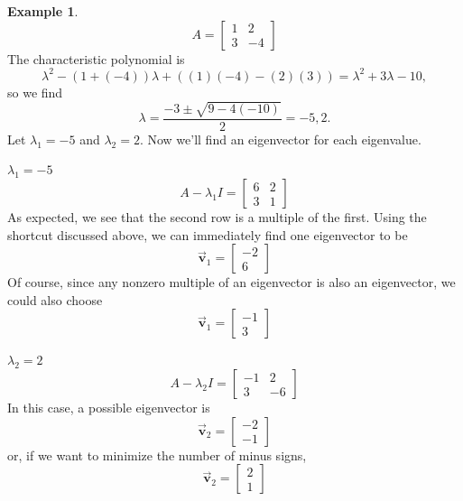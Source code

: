 \documentclass[reqno]{immbook}
\newcommand{\BV}{\vec{\textbf{v}}}
\numberwithin{equation}{chapter}
\numberwithin{question}{section}
\numberwithin{theorem}{chapter}
\numberwithin{figure}{chapter}
\theoremstyle{definition}
\newtheorem{example}{Example}[section]
\begin{document}
\begin{example}
\[
   A = \begin{bmatrix} 1 & 2 \\ 3 & -4 \end{bmatrix}
\]
The characteristic polynomial is
\[
   \lambda^2 - (1+(-4))\lambda + ((1)(-4)-(2)(3)) = \lambda^2 + 3\lambda - 10,
\]
so we find
\[
  \lambda = \frac{-3\pm\sqrt{9-4(-10)}}{2} = -5, 2.
\]
Let $\lambda_1 = -5$ and $\lambda_2 = 2$.
Now we'll find an eigenvector for each eigenvalue.

\medskip
\noindent
\underline{$\lambda_1 = -5$}
\[
   A-\lambda_1 I = \begin{bmatrix}
                   6 & 2 \\ 3 & 1
                   \end{bmatrix}
\]
As expected, we see that the second row
is a multiple of the first. Using the shortcut discussed
above, we can immediately find one eigenvector to be
\[
   \BV_1 = \begin{bmatrix} -2 \\ 6 \end{bmatrix}
\]
Of course, since any nonzero multiple of an eigenvector
is also an eigenvector, we could also choose
\[
   \BV_1 = \begin{bmatrix} -1 \\ 3 \end{bmatrix}
\]

\medskip
\noindent
\underline{$\lambda_2 = 2$}
\[
  A - \lambda_2 I = \begin{bmatrix}
                      -1 & 2 \\ 3 & -6
                    \end{bmatrix}
\]
In this case, a possible eigenvector is
\[
  \BV_2 = \begin{bmatrix} -2 \\ -1 \end{bmatrix}
\]
or, if we want to minimize the number of minus signs,
\[
  \BV_2 = \begin{bmatrix} 2 \\ 1 \end{bmatrix}
\]
\end{example}
\end{document}
